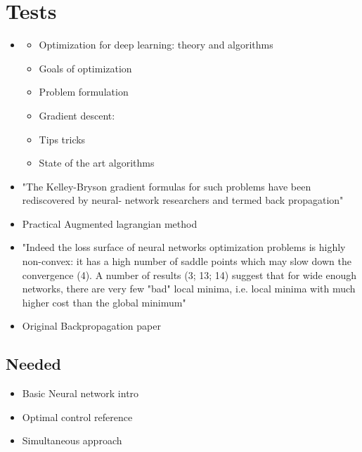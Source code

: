 \chapter{Tests}
\label{cha:3}
\begin{itemize}
\item
\cite{sun2019optimization}
\begin{itemize}
	\item Optimization for deep learning: theory and algorithms
	\item Goals of optimization
	\item Problem formulation
	\item Gradient descent:
	\item Tips  tricks
	\item State of the art algorithms
\end{itemize}


\item
\cite{dreyfus1990}

"The Kelley-Bryson gradient
formulas for such problems have been rediscovered by neural-
network researchers and termed back propagation"

\item
\cite{Birgin2009}

Practical Augmented lagrangian method

\item
\cite{jacot2020neural}
"Indeed
the loss surface of neural networks optimization problems is highly non-convex: it has a high number
of saddle points which may slow down the convergence (4). A number of results (3; 13; 14) suggest
that for wide enough networks, there are very few "bad" local minima, i.e. local minima with much
higher cost than the global minimum"
\item
\cite{Rumelhart1986}
Original Backpropagation paper


\end{itemize}

\section{Needed}

\begin{itemize}
\item
Basic Neural network intro

\item
Optimal control reference


\item
Simultaneous approach
\end{itemize}



